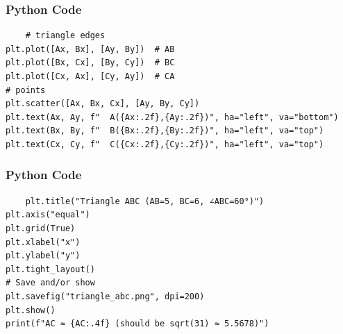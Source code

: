 \documentclass{beamer}
\begin{document}
\begin{frame}[fragile]
    \frametitle{Python Code}
    \begin{lstlisting}
    # triangle edges
plt.plot([Ax, Bx], [Ay, By])  # AB
plt.plot([Bx, Cx], [By, Cy])  # BC
plt.plot([Cx, Ax], [Cy, Ay])  # CA
# points
plt.scatter([Ax, Bx, Cx], [Ay, By, Cy])
plt.text(Ax, Ay, f"  A({Ax:.2f},{Ay:.2f})", ha="left", va="bottom")
plt.text(Bx, By, f"  B({Bx:.2f},{By:.2f})", ha="left", va="top")
plt.text(Cx, Cy, f"  C({Cx:.2f},{Cy:.2f})", ha="left", va="top")

    \end{lstlisting}
\end{frame}

 \begin{frame}[fragile]
    \frametitle{ Python Code}
    \begin{lstlisting}
    plt.title("Triangle ABC (AB=5, BC=6, ∠ABC=60°)")
plt.axis("equal")
plt.grid(True)
plt.xlabel("x")
plt.ylabel("y")
plt.tight_layout()
# Save and/or show
plt.savefig("triangle_abc.png", dpi=200)
plt.show()
print(f"AC ≈ {AC:.4f} (should be sqrt(31) ≈ 5.5678)")
   
\end{lstlisting}
\end{frame}
\end{document}
